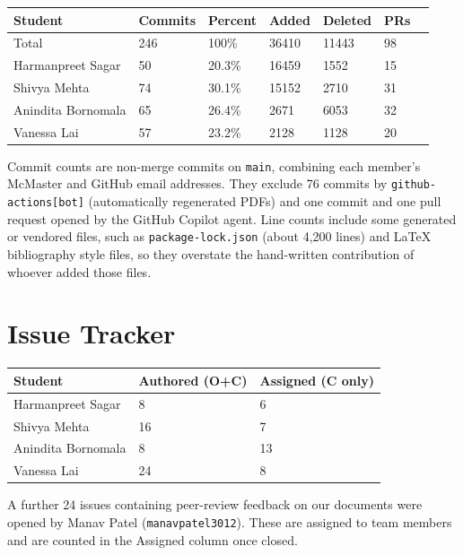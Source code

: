 \documentclass{article}
\begin{document}
\begin{table}[H]
\centering
\small
\setlength{\tabcolsep}{4pt}
\begin{tabular}{lllllll}
\toprule
\textbf{Student} & \textbf{Commits} & \textbf{Percent} & \textbf{Added} &
\textbf{Deleted} & \textbf{PRs}\\
\midrule
Total & 246 & 100\% & 36410 & 11443 & 98\\
Harmanpreet Sagar & 50 & 20.3\% & 16459 & 1552 & 15\\
Shivya Mehta & 74 & 30.1\% & 15152 & 2710 & 31\\
Anindita Bornomala & 65 & 26.4\% & 2671 & 6053 & 32\\
Vanessa Lai & 57 & 23.2\% & 2128 & 1128 & 20\\
\bottomrule
\end{tabular}
\end{table}

Commit counts are non-merge commits on \texttt{main}, combining each member's
McMaster and GitHub email addresses. They exclude 76 commits by
\texttt{github-actions[bot]} (automatically regenerated PDFs) and one commit and
one pull request opened by the GitHub Copilot agent. Line counts include some
generated or vendored files, such as \texttt{package-lock.json} (about 4,200
lines) and LaTeX bibliography style files, so they overstate the hand-written
contribution of whoever added those files.

\section{Issue Tracker}

\begin{table}[H]
\centering
\begin{tabular}{lll}
\toprule
\textbf{Student} & \textbf{Authored (O+C)} & \textbf{Assigned (C only)}\\
\midrule
Harmanpreet Sagar & 8 & 6 \\
Shivya Mehta & 16 & 7 \\
Anindita Bornomala & 8 & 13 \\
Vanessa Lai & 24 & 8 \\
\bottomrule
\end{tabular}
\end{table}

A further 24 issues containing peer-review feedback on our documents were
opened by Manav Patel (\texttt{manavpatel3012}). These are assigned to team
members and are counted in the Assigned column once closed.
\end{document}
